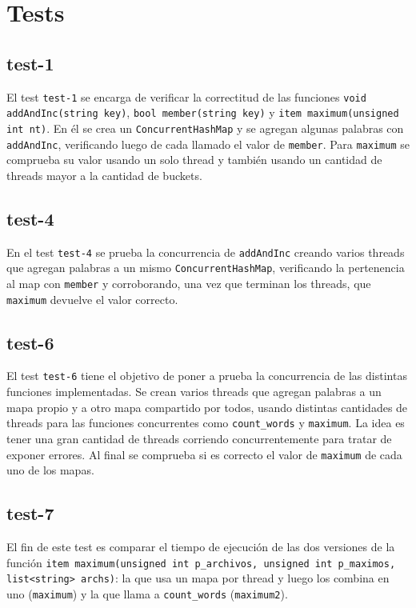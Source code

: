 \section{Tests}


\subsection{test-1}

El test \texttt{test-1} se encarga de verificar la correctitud de las funciones \texttt{void addAndInc(string key)}, \texttt{bool member(string key)} y \texttt{item maximum(unsigned int nt)}. En él se crea un \texttt{ConcurrentHashMap} y se agregan algunas palabras con \texttt{addAndInc}, verificando luego de cada llamado el valor de \texttt{member}. Para \texttt{maximum} se comprueba su valor usando un solo thread y también usando un cantidad de threads mayor a la cantidad de buckets.


\subsection{test-4}

En el test \texttt{test-4} se prueba la concurrencia de \texttt{addAndInc} creando varios threads que agregan palabras a un mismo \texttt{ConcurrentHashMap}, verificando la pertenencia al map con \texttt{member} y corroborando, una vez que terminan los threads, que \texttt{maximum} devuelve el valor correcto.


\subsection{test-6}

El test \texttt{test-6} tiene el objetivo de poner a prueba la concurrencia de las distintas funciones implementadas. Se crean varios threads que agregan palabras a un mapa propio y a otro mapa compartido por todos, usando distintas cantidades de threads para las funciones concurrentes como \texttt{count\_words} y \texttt{maximum}. La idea es tener una gran cantidad de threads corriendo concurrentemente para tratar de exponer errores. Al final se comprueba si es correcto el valor de \texttt{maximum} de cada uno de los mapas.


\subsection{test-7}

El fin de este test es comparar el tiempo de ejecución de las dos versiones de la función \texttt{item maximum(unsigned int p_archivos, unsigned int p_maximos, list<string> archs)}: la que usa un mapa por thread y luego los combina en uno (\texttt{maximum}) y la que llama a \texttt{count\_words} (\texttt{maximum2}).


